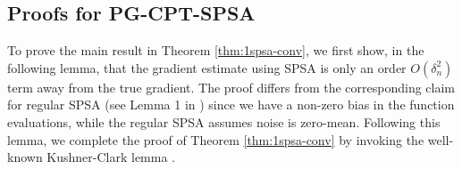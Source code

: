 \subsection{Proofs for PG-CPT-SPSA}
\label{appendix:1spsa}

To prove the main result in Theorem \ref{thm:1spsa-conv}, we first show, in the following lemma, that the gradient estimate using SPSA is only an order $O(\delta_n^2)$ term away from the true gradient. The proof differs from the corresponding claim for regular SPSA (see Lemma 1 in \cite{spall}) since we have a non-zero bias in the function evaluations, while the regular SPSA assumes noise is zero-mean. Following this lemma, we complete the proof of Theorem \ref{thm:1spsa-conv} by invoking the well-known Kushner-Clark lemma \cite{kushner-clark}.

